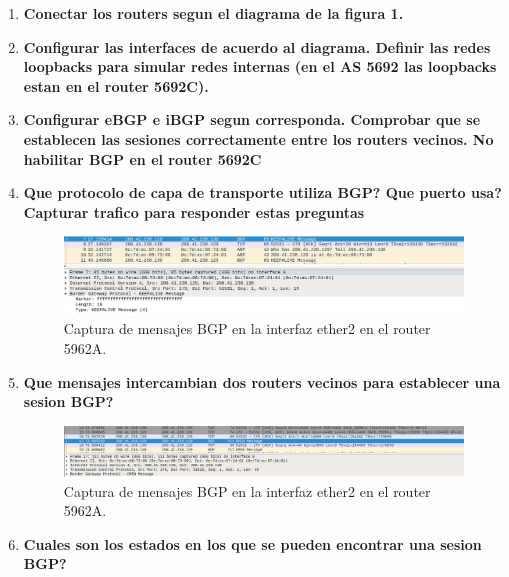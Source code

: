 \documentclass[letterpaper,12pt]{article}
\begin{document}
	\begin{enumerate}
		\item \textbf{Conectar los routers segun el diagrama de la figura 1.}
		\item \textbf{Configurar las interfaces de acuerdo al diagrama. Definir las redes loopbacks para simular redes internas (en el AS 5692 las loopbacks estan en el router 5692C).}
		\item \textbf{Configurar eBGP e iBGP segun corresponda. Comprobar que se establecen las sesiones correctamente entre los routers vecinos. No habilitar BGP en el router 5692C} \\
		\item \textbf{Que protocolo de capa de transporte utiliza BGP? Que puerto usa? Capturar trafico para responder estas preguntas}\\
		\begin{figure}[H] 
			
			\centering \includegraphics[width=0.5\columnwidth]{figure/bgp-transport.png}
			\caption{
					\label{fig:samplesetup} %
					Captura de mensajes BGP en la interfaz ether2 en el router 5962A.
			}
		\end{figure}
		\item \textbf{Que mensajes intercambian dos routers vecinos para establecer una sesion BGP?}\\
		\begin{figure}[H] 
			
			\centering \includegraphics[width=0.5\columnwidth]{figure/bgp-open.png}
			\caption{
					\label{fig:samplesetup} %
					Captura de mensajes BGP en la interfaz ether2 en el router 5962A.
			}
		\end{figure}
		\item \textbf{Cuales son los estados en los que se pueden encontrar una sesion BGP?}\\
	
	
	\end{enumerate}
\end{document}
